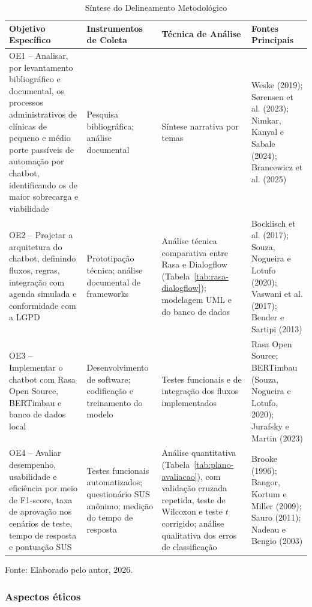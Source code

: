\documentclass[12pt,a4paper]{extarticle}
\begin{document}
\begin{table}[H]
\centering
\caption{Síntese do Delineamento Metodológico}
\label{tab:delineamento}
\small
\begin{tabular}{p{5.0cm}p{2.9cm}p{3.4cm}p{3.4cm}}
\hline
\textbf{Objetivo Específico} & \textbf{Instrumentos de Coleta} & \textbf{Técnica de Análise} & \textbf{Fontes Principais} \\
\hline
OE1 -- Analisar, por levantamento bibliográfico e documental, os processos administrativos de clínicas de pequeno e médio porte passíveis de automação por chatbot, identificando os de maior sobrecarga e viabilidade &
Pesquisa bibliográfica; análise documental &
Síntese narrativa por temas &
Weske (2019); Sørensen et al. (2023); Nimkar, Kanyal e Sabale (2024); Brancewicz et al. (2025) \\
OE2 -- Projetar a arquitetura do chatbot, definindo fluxos, regras, integração com agenda simulada e conformidade com a LGPD &
Prototipação técnica; análise documental de frameworks &
Análise técnica comparativa entre Rasa e Dialogflow (Tabela~\ref{tab:rasa-dialogflow}); modelagem UML e do banco de dados &
Bocklisch et al. (2017); Souza, Nogueira e Lotufo (2020); Vaswani et al. (2017); Bender e Sartipi (2013) \\
OE3 -- Implementar o chatbot com Rasa Open Source, BERTimbau e banco de dados local &
Desenvolvimento de software; codificação e treinamento do modelo &
Testes funcionais e de integração dos fluxos implementados &
Rasa Open Source; BERTimbau (Souza, Nogueira e Lotufo, 2020); Jurafsky e Martin (2023) \\
OE4 -- Avaliar desempenho, usabilidade e eficiência por meio de F1-score, taxa de aprovação nos cenários de teste, tempo de resposta e pontuação SUS &
Testes funcionais automatizados; questionário SUS anônimo; medição do tempo de resposta &
Análise quantitativa (Tabela~\ref{tab:plano-avaliacao}), com validação cruzada repetida, teste de Wilcoxon e teste $t$ corrigido; análise qualitativa dos erros de classificação &
Brooke (1996); Bangor, Kortum e Miller (2009); Sauro (2011); Nadeau e Bengio (2003) \\
\hline
\end{tabular}
\vspace{0.3cm}
\footnotesize{Fonte: Elaborado pelo autor, 2026.}
\end{table}

\subsubsection{Aspectos éticos}
\label{sec:aspectos-eticos}
\end{document}
